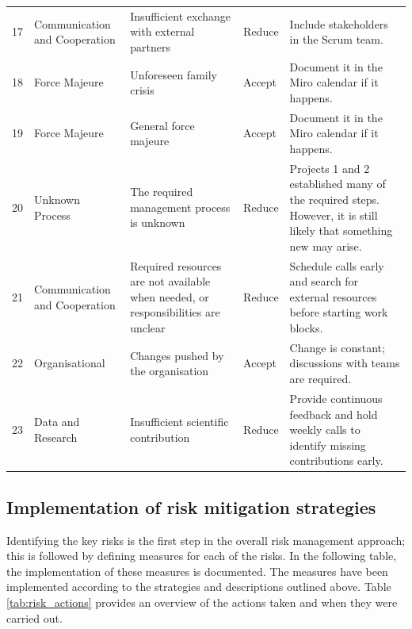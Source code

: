 \begin{longtable}{@{} C{1.2cm} L{2.5cm} L{4.5cm} L{2.5cm} L{5cm} @{}}
17 & Communication and Cooperation & Insufficient exchange with external partners & Reduce & Include stakeholders in the Scrum team. \\
18 & Force Majeure & Unforeseen family crisis & Accept & Document it in the Miro calendar if it happens. \\
19 & Force Majeure & General force majeure & Accept & Document it in the Miro calendar if it happens. \\
20 & Unknown Process & The required management process is unknown & Reduce & Projects 1 and 2 established many of the required steps. However, it is still likely that something new may arise. \\
21 & Communication and Cooperation & Required resources are not available when needed, or responsibilities are unclear & Reduce & Schedule calls early and search for external resources before starting work blocks. \\
22 & Organisational & Changes pushed by the organisation & Accept & Change is constant; discussions with teams are required. \\
23 & Data and Research & Insufficient scientific contribution & Reduce & Provide continuous feedback and hold weekly calls to identify missing contributions early. \\

\end{longtable}

\subsection*{Implementation of risk mitigation strategies}
Identifying the key risks is the first step in the overall risk management approach; this is followed by defining measures for each of the risks. In the following table, the implementation of these measures is documented. The measures have been implemented according to the strategies and descriptions outlined above. Table \ref{tab:risk_actions} provides an overview of the actions taken and when they were carried out.


